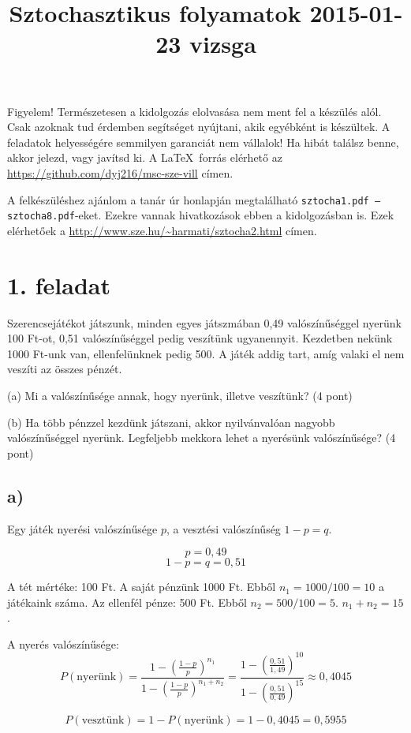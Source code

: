 \documentclass[a4paper,12pt]{article}   		%
\title{Sztochasztikus folyamatok 2015-01-23 vizsga}
\begin{document}
\maketitle

Figyelem! Természetesen a kidolgozás elolvasása nem ment fel a készülés
alól. Csak azoknak tud érdemben segítséget nyújtani, akik egyébként is
készültek. A feladatok helyességére semmilyen garanciát nem vállalok!
Ha hibát találsz benne, akkor jelezd, vagy javítsd ki. A \LaTeX\ forrás
elérhető az \url{https://github.com/dyj216/msc-sze-vill} címen.

A felkészüléshez ajánlom a tanár úr honlapján megtalálható 
\texttt{sztocha1.pdf -- sztocha8.pdf}-eket. Ezekre vannak hivatkozások 
ebben a kidolgozásban is. Ezek elérhetőek a 
\url{http://www.sze.hu/~harmati/sztocha2.html} címen.

\section*{1. feladat}
Szerencsejátékot játszunk, minden egyes játszmában 0,49 valószínűséggel
nyerünk 100 Ft-ot, 0,51 valószínűséggel pedig veszítünk ugyanennyit. 
Kezdetben nekünk 1000 Ft-unk van, ellenfelünknek pedig 500. A játék
addig tart, amíg valaki el nem veszíti az összes pénzét.

(a) Mi a valószínűsége annak, hogy nyerünk, illetve veszítünk? (4 pont)

(b) Ha több pénzzel kezdünk játszani, akkor nyilvánvalóan nagyobb 
valószínűséggel nyerünk. Legfeljebb mekkora lehet a nyerésünk
valószínűsége? (4 pont)
\subsection*{a)}
Egy játék nyerési valószínűsége $p$, a vesztési valószínűség $1-p=q$.

\[p = 0,49\]
\[1-p = q = 0,51\]

A tét mértéke: 100 Ft. A saját pénzünk 1000 Ft. Ebből $n_1 = 1000/100=10$ a 
játékaink száma. Az ellenfél pénze: 500 Ft. Ebből $n_2 = 500/100=5$.
$n_1 + n_2 = 15$.

A nyerés valószínűsége:
\[P(\text{nyerünk}) = \frac{1-\left(\frac{1-p}{p}\right)^{n_1}}
{1-\left(\frac{1-p}{p}\right)^{n_1+n_2}} = 
\frac{1-\left(\frac{0,51}{1,49}\right)^{10}}
{1-\left(\frac{0,51}{0,49}\right)^{15}} \approx 0,4045 \]

\[P(\text{vesztünk}) = 1 - P(\text{nyerünk}) = 1 - 0,4045 = 0,5955\]
\end{document}
